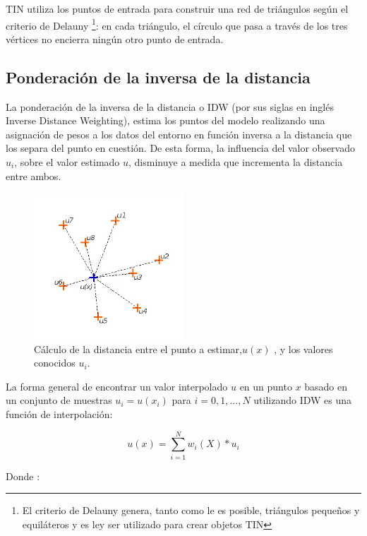 TIN utiliza los puntos de entrada para construir una red de triángulos según el criterio de Delauny
\footnote{El criterio de Delauny genera, tanto como le es posible, triángulos pequeños y
equiláteros y es ley ser utilizado para crear objetos TIN}: en cada triángulo, el círculo que pasa
a través de los tres vértices no encierra ningún otro punto de entrada\cite{cPachecoMDE2003}.

\subsection{Ponderación de la inversa de la distancia}
La ponderación de la inversa de la distancia o IDW (por sus siglas en inglés Inverse Distance
Weighting), estima los puntos del modelo realizando una asignación de pesos a los datos del
entorno en función inversa a la distancia que los separa del punto en cuestión. De esta forma,
la influencia del valor observado $u_{i}$, sobre el valor estimado $u$, disminuye a medida que
incrementa la distancia entre ambos.


\begin{figure}[!htbp]
\centering
\includegraphics[width=0.5\textwidth]{capitulo-2/graphics/idw-distancia.jpg}
\caption{\label{fig:sig-idw-distancia} Cálculo de la distancia entre el punto a estimar,$u(x)$ , y los valores conocidos $u_{i}$.}

\end{figure}

La forma general de encontrar un valor interpolado $u$ en un punto $x$ basado en un conjunto de
muestras $u_i = u (x_i)$ para $i = 0,1, ..., N$ utilizando IDW es una función de interpolación:

\begin{equation}\label{eq:interpolacion-idw}
 u(x) = \sum_{i=1}^{N} w_i(X) * u_{i}
\end{equation}

Donde :

